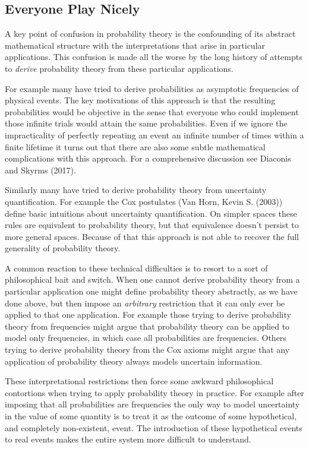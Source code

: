 \documentclass[
  letterpaper,
  DIV=11,
  numbers=noendperiod]{scrartcl}
\begin{document}
\hypertarget{everyone-play-nicely}{%
\subsection{Everyone Play Nicely}\label{everyone-play-nicely}}

A key point of confusion in probability theory is the confounding of its
abstract mathematical structure with the interpretations that arise in
particular applications. This confusion is made all the worse by the
long history of attempts to \emph{derive} probability theory from these
particular applications.

For example many have tried to derive probabilities as asymptotic
frequencies of physical events. The key motivations of this approach is
that the resulting probabilities would be objective in the sense that
everyone who could implement those infinite trials would attain the same
probabilities. Even if we ignore the impracticality of perfectly
repeating an event an infinite number of times within a finite lifetime
it turns out that there are also some subtle mathematical complications
with this approach. For a comprehensive discussion see Diaconis and
Skyrms (2017).

Similarly many have tried to derive probability theory from uncertainty
quantification. For example the Cox postulates (Van Horn, Kevin S.
(2003)) define basic intuitions about uncertainty quantification. On
simpler spaces these rules are equivalent to probability theory, but
that equivalence doesn't persist to more general spaces. Because of that
this approach is not able to recover the full generality of probability
theory.

A common reaction to these technical difficulties is to resort to a sort
of philosophical bait and switch. When one cannot derive probability
theory from a particular application one might define probability theory
abstractly, as we have done above, but then impose an \emph{arbitrary}
restriction that it can only ever be applied to that one application.
For example those trying to derive probability theory from frequencies
might argue that probability theory can be applied to model only
frequencies, in which case all probabilities are frequencies. Others
trying to derive probability theory from the Cox axioms might argue that
any application of probability theory always models uncertain
information.

These interpretational restrictions then force some awkward
philosophical contortions when trying to apply probability theory in
practice. For example after imposing that all probabilities are
frequencies the only way to model uncertainty in the value of some
quantity is to treat it as the outcome of some hypothetical, and
completely non-existent, event. The introduction of these hypothetical
events to real events makes the entire system more difficult to
understand.
\end{document}
